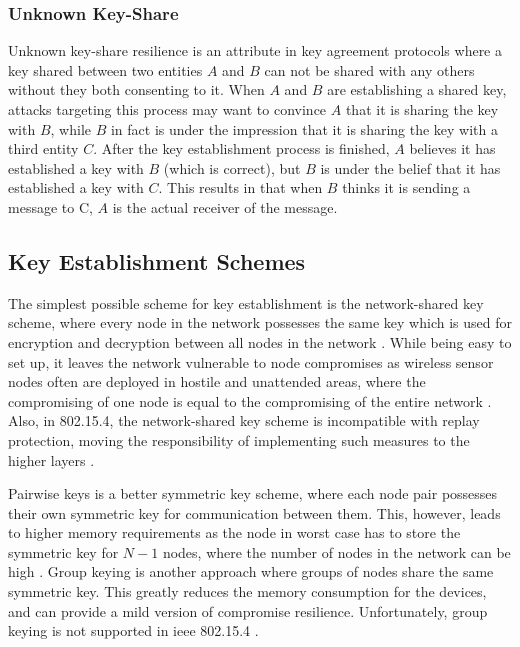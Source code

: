 \subsubsection{Unknown Key-Share}

Unknown key-share resilience is an attribute in key agreement protocols where a key shared between two entities $A$ and $B$ can not be shared with any others without they both consenting to it. When $A$ and $B$ are establishing a shared key, attacks targeting this process may want to convince $A$ that it is sharing the key with $B$, while $B$ in fact is under the impression that it is sharing the key with a third entity $C$. After the key establishment process is finished, $A$ believes it has established a key with $B$ (which is correct), but $B$ is under the belief that it has established a key with $C$. This results in that when $B$ thinks it is sending a message to C, $A$ is the actual receiver of the message.


\subsection{Key Establishment Schemes}

The simplest possible scheme for key establishment is the network-shared key scheme, where every node in the network possesses the same key which is used for encryption and decryption between all nodes in the network \cite{perrig2004security}. While being easy to set up, it leaves the network vulnerable to node compromises as wireless sensor nodes often are deployed in hostile and unattended areas, where the compromising of one node is equal to the compromising of the entire network \cite{krentz20136lowpan}. Also, in 802.15.4, the network-shared key scheme is incompatible with replay protection, moving the responsibility of implementing such measures to the higher layers \cite{sastry2004security}.

Pairwise keys is a better symmetric key scheme, where each node pair possesses their own symmetric key for communication between them. This, however, leads to higher memory requirements as the node in worst case has to store the symmetric key for $N-1$ nodes, where the number of nodes in the network can be high \cite{perrig2004security}. Group keying is another approach where groups of nodes share the same symmetric key. This greatly reduces the memory consumption for the devices, and can provide a mild version of compromise resilience. Unfortunately, group keying is not supported in \gls{ieee} 802.15.4 \cite{sastry2004security}.

